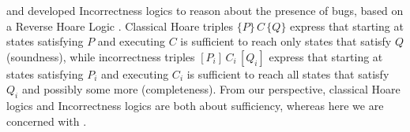 \citeauthor{IncorrectnessLogic} and \citeauthor{IncorrectSeparation}
developed Incorrectness logics to reason about the presence of bugs, 
based on a Reverse Hoare Logic \cite{reverseHoare}.
Classical Hoare triples $\{ P \}\, C\, \{ Q \}$ express  that starting 
at states satisfying $P$ and executing   $C$  is sufficient to reach only states
that satisfy $ Q $ (soundness), while
 incorrectness triples $[ P_i ]\, C_i\, [ Q _i ]$ express  that starting at  
 states satisfying $P_i$ and executing  $C_i$ is sufficient to reach 
 all states that satisfy $Q_i$ and possibly some more (completeness).
From our perspective, classical Hoare logics and Incorrectness logics
are both about sufficiency, whereas here we are concerned with \Nec.









